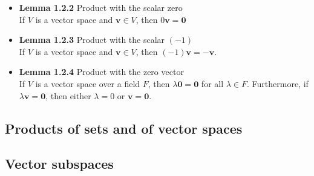 \documentclass[11pt,a4paper]{article}
\begin{document}
\begin{itemize}
    \item \textbf{Lemma 1.2.2} Product with the scalar zero \\
        If $V$ is a vector space and $\mathbf{v} \in V$, then $0\mathbf{v} = \mathbf{0}$

    \item \textbf{Lemma 1.2.3} Product with the scalar $(-1)$ \\
        If $V$ is a vector space and $\mathbf{v} \in V$, then $(-1)\mathbf{v} = -\mathbf{v}$.

    \item \textbf{Lemma 1.2.4} Product with the zero vector \\
        If $V$ is a vector space over a field $F$, then $\lambda\mathbf{0} = \mathbf{0}$
        for all $\lambda \in F$.
        Furthermore, if $\lambda \mathbf{v} = \mathbf{0}$,
        then either $\lambda = 0$ or $\mathbf{v} = \mathbf{0}$.
\end{itemize}

\subsection{Products of sets and of vector spaces}

\subsection{Vector subspaces}
\end{document}
